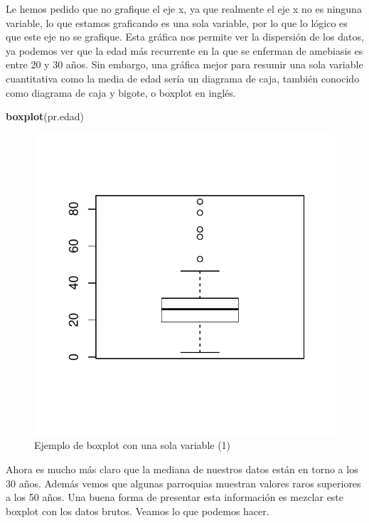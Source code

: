\documentclass[]{article}
\newenvironment{Shaded}{\begin{snugshade}}{\end{snugshade}}
\newcommand{\KeywordTok}[1]{\textcolor[rgb]{0.13,0.29,0.53}{\textbf{{#1}}}}
\newcommand{\NormalTok}[1]{{#1}}
\begin{document}
Le hemos pedido que no grafique el eje x, ya que realmente el eje x no
es ninguna variable, lo que estamos graficando es una sola variable, por
lo que lo lógico es que este eje no se grafique. Esta gráfica nos
permite ver la dispersión de los datos, ya podemos ver que la edad más
recurrente en la que se enferman de amebiasis es entre 20 y 30 años. Sin
embargo, una gráfica mejor para resumir una sola variable cuantitativa
como la media de edad sería un diagrama de caja, también conocido como
diagrama de caja y bigote, o boxplot en inglés.

\begin{Shaded}
\begin{Highlighting}[]
\KeywordTok{boxplot}\NormalTok{(pr.edad)}
\end{Highlighting}
\end{Shaded}

\begin{figure}

{\centering \includegraphics{index_files/figure-latex/unnamed-chunk-15-1} 

}

\caption{Ejemplo de boxplot con una sola variable (1)}\label{fig:unnamed-chunk-15}
\end{figure}

Ahora es mucho más claro que la mediana de nuestros datos están en torno
a los 30 años. Además vemos que algunas parroquias muestran valores
raros superiores a los 50 años. Una buena forma de presentar esta
información es mezclar este boxplot con los datos brutos. Veamos lo que
podemos hacer.
\end{document}
